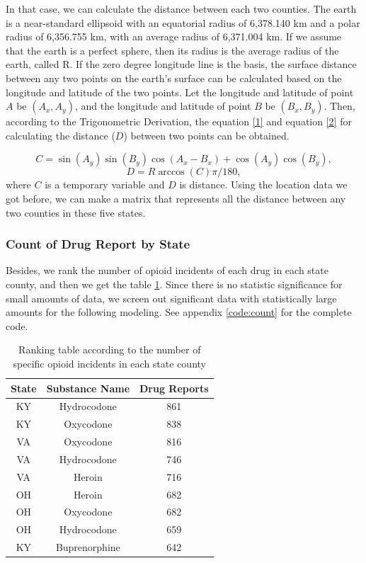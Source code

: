 \documentclass{mcmthesis}
\begin{document}
In that case, we can calculate the distance between each two counties. The earth is a near-standard ellipsoid with an equatorial radius of 6,378.140 km and a polar radius of 6,356.755 km, with an average radius of 6,371.004 km. If we assume that the earth is a perfect sphere, then its radius is the average radius of the earth, called R. If the zero degree longitude line is the basis, the surface distance between any two points on the earth's surface can be calculated based on the longitude and latitude of the two points. Let the longitude and latitude of point $A$ be $(A_x, A_y)$, and the longitude and latitude of point $B$ be $(B_x, B_y)$. Then, according to the Trigonometric Derivation, the equation \ref{1} and equation \ref{2} for calculating the distance ($D$) between two points can be obtained.

     \begin{equation}
          \label{1}
          C = \sin(A_y)\sin(B_y)\cos(A_x-B_x) + \cos(A_y)\cos(B_y),
     \end{equation}
     \begin{equation}
         \label{2}
         D = R\arccos(C)\pi/180,
     \end{equation}
    where $C$ is a temporary variable and $D$ is distance. Using the location data we got before, we can make a matrix that represents all the distance between any two counties in these five states.

\subsubsection{Count of Drug Report by State}

    Besides, we rank the number of opioid incidents of each drug in each state county, and then we get the table \ref{tab:my_label}. Since there is no statistic significance for small amounts of data, we screen out significant data with statistically large amounts for the following modeling. See appendix \ref{code:count} for the complete code. 
    
\begin{table}[H]
    \centering  
    \caption{Ranking table according to the number of specific opioid incidents in each state county }
    \label{tab:my_label}
    \begin{tabular}{|c|c|c|}
        \hline
        State & Substance Name & Drug Reports \\\hline
        KY & Hydrocodone & 861 \\
        KY & Oxycodone & 838 \\
        VA & Oxycodone & 816 \\
        VA & Hydrocodone & 746 \\
        VA & Heroin & 716 \\
        OH & Heroin & 682 \\
        OH & Oxycodone & 682 \\
        OH & Hydrocodone & 659 \\
        KY & Buprenorphine & 642 \\\hline
    \end{tabular}
\end{table}    
    
\end{document}
